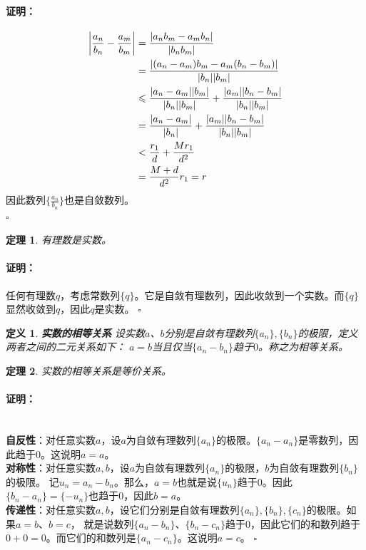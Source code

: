 \documentclass[12pt,UTF8]{ctexbook}
\newtheorem{df}{定义}[section]
\newtheorem{tm}{定理}[section]
\renewenvironment{proof}{\paragraph{\textbf{证明：}}}{\hfill$\square$}
\begin{document}
\begin{appendix}
\begin{proof}
\begin{align}
        \left|\frac{a_n}{b_n} - \frac{a_m}{b_m}\right| &= \frac{|a_nb_m - a_mb_n|}{|b_nb_m|} \notag \\
        &= \frac{|(a_n - a_m)b_m - a_m(b_n - b_m)|}{|b_n||b_m|} \notag \\
        &\leqslant \frac{|a_n - a_m||b_m|}{|b_n||b_m|} + \frac{|a_m||b_n - b_m|}{|b_n||b_m|}\notag \\
        &= \frac{|a_n - a_m|}{|b_n|} + \frac{|a_m||b_n - b_m|}{|b_n||b_m|} \notag \\
        &< \frac{r_1}{d} + \frac{Mr_1}{d^2} \notag \\
        &= \frac{M+d}{d^2} r_1 = r \notag
    \end{align} 
    因此数列$\{\frac{a_n}{b_n}\}$也是自敛数列。\\
\end{proof}

\begin{tm}\label{tm:a-1-5}
    有理数是实数。
\end{tm}
\begin{proof}
    任何有理数$q$，考虑常数列$\{q\}$。它是自敛有理数列，因此收敛到一个实数。而$\{q\}$显然收敛到$q$，因此$q$是实数。
\end{proof}

\begin{df}\textbf{实数的相等关系}
    设实数$a$、$b$分别是自敛有理数列$\{a_n\}, \{b_n\}$的极限，定义两者之间的二元关系如下：
    $a = b$当且仅当$\{a_n - b_n\}$趋于$0$。称之为相等关系。
\end{df}

\begin{tm}\label{tm:a-1-10}
    实数的相等关系是等价关系。
\end{tm}
\begin{proof}
    \mbox{} \\
    \textbf{自反性}：对任意实数$a$，设$a$为自敛有理数列$\{a_n\}$的极限。$\{a_n - a_n\}$是零数列，因此趋于$0$。这说明$a = a$。\\
    \textbf{对称性}：对任意实数$a, b$，设$a$为自敛有理数列$\{a_n\}$的极限，$b$为自敛有理数列$\{b_n\}$的极限。
    记$u_n = a_n - b_n$。那么，$a = b$也就是说$\{u_n\}$趋于$0$。因此$\{b_n - a_n\} = \{-u_n\}$也趋于$0$，因此$b = a$。\\
    \textbf{传递性}：对任意实数$a, b$，设它们分别是自敛有理数列$\{a_n\}, \{b_n\}, \{c_n\}$的极限。如果$a=b$、$b=c$，
    就是说数列$\{a_n - b_n\}$、$\{b_n - c_n\}$趋于$0$，因此它们的和数列趋于$0+0=0$。而它们的和数列是$\{a_n - c_n\}$。这说明$a=c$。
\end{proof}


\end{appendix}
\end{document}
